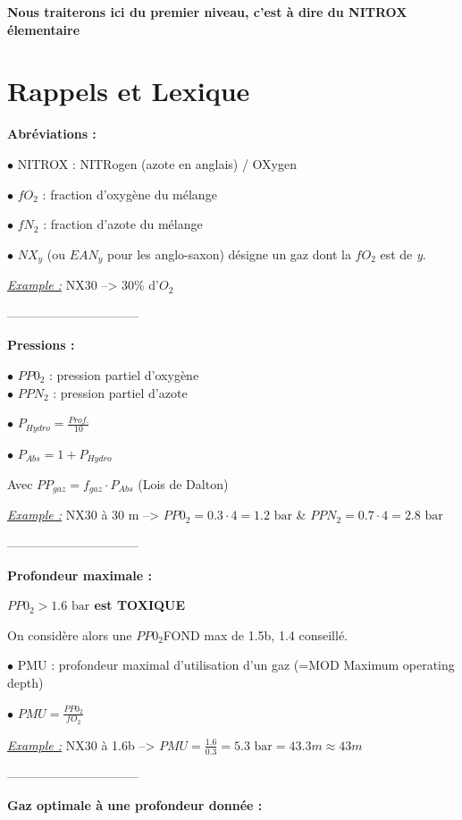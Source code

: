\documentclass[12pt,a4paper,notitlepage,colorinlistoftodos]{article}
\begin{document}
\textbf{Nous traiterons ici du premier niveau, c'est à dire du NITROX élementaire}

\newpage

\section{Rappels et Lexique}

\textbf{Abréviations :}

$\bullet$ NITROX : NITRogen (azote en anglais) / OXygen

$\bullet$ $fO_2$ : fraction d'oxygène du mélange

$\bullet$ $fN_2$ : fraction d'azote du mélange

$\bullet$ $NX_{y}$ (ou $EAN_{y}$ pour les anglo-saxon) désigne un gaz dont la $fO_2$ est de \textit{y}. 

\underline{\textit{Example :}} NX30 --> 30\% d'$O_{2}$

--------------------------------

\textbf{Pressions :}

$\bullet$ $PP0_2$ : pression partiel d'oxygène \\
$\bullet$ $PPN_2$ : pression partiel d'azote 

$\bullet$ $P_{Hydro} = \frac{Prof.}{10}$

$\bullet$ $P_{Abs} = 1 + P_{Hydro}$

Avec $PP_{gaz} = f_{gaz} \cdot P_{Abs}$  (Lois de Dalton) 

\underline{\textit{Example :}} NX30 à 30 m --> $PP0_2 = 0.3 \cdot 4 = 1.2 \text{ bar}$  \& $PPN_2 = 0.7 \cdot 4 = 2.8 \text{ bar}$

--------------------------------

\textbf{Profondeur maximale :}

\color{red} \textbf{$PP0_2 > 1.6 \text{ bar}$ est TOXIQUE} \color{black}

On considère alors une $PP0_2$FOND max de 1.5b, 1.4 conseillé.

$\bullet$ PMU : profondeur maximal d'utilisation d'un gaz (=MOD Maximum operating depth) 

$\bullet$ $PMU =  \frac{PP0_2}{fO_2}$ 

\underline{\textit{Example :}} NX30 à 1.6b -->   $PMU =  \frac{1.6}{0.3} = 5.3 \text{ bar} = 43.3 m \approx 43 m$

--------------------------------

\textbf{Gaz optimale à une profondeur donnée :}
\end{document}
